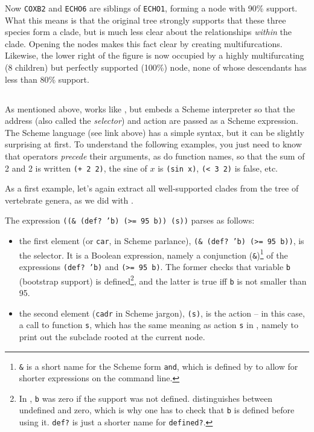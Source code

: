 \noindent{}Now \texttt{COXB2} and \texttt{ECHO6} are siblings of
\texttt{ECHO1}, forming a node with 90\% support. What this means is that the
original tree strongly supports that these three species form a clade, but is
much less clear about the relationships \emph{within} the clade. Opening the
nodes makes this fact clear by creating multifurcations. Likewise, the lower
right of the figure is now occupied by a highly multifurcating (8 children) but
perfectly supported (100\%) node, none of whose descendants has less than 80\%
support.

\subsection{\sched}

As mentioned above, \sched{} works like \ed{}, but embeds a Scheme interpreter
so that the address (also called the {\em selector}) and action are passed as a
Scheme expression. The Scheme language (see link above) has a simple syntax,
but it can be slightly surprising at first. To understand the following
examples, you just need to know that operators \emph{precede} their arguments,
as do function names, so that the sum of 2 and 2 is written \texttt{(+ 2 2)},
the sine of $x$ is \texttt{(sin x)}, \texttt{(< 3 2)} is false, etc.

\noindent{}As a first example, let's again extract all
well-supported clades from the tree of vertebrate genera, as we did with \ed.


\begin{samepage}

\end{samepage}

The expression \texttt{((\& (def? 'b) (>= 95 b)) (s))} parses as follows:
\begin{itemize}
	\item the first element (or \texttt{car}, in Scheme parlance),
	\texttt{(\& (def? 'b) (>= 95 b))}, is the selector.  It is a Boolean
	expression, namely a conjunction (\texttt{\&})\footnote{\texttt{\&} is
	a short name for the Scheme form \texttt{and}, which is defined by
	\sched{} to allow for shorter expressions on the command line.} of the
	expressions \texttt{(def? 'b)} and \texttt{(>= 95 b)}.  The former
	checks that variable \texttt{b} (bootstrap support) is
	defined\footnote{In \ed, \texttt{b} was zero if the support was not
	defined. \sched{} distinguishes between undefined and zero, which is
	why one has to check that \texttt{b} is defined before using it.
	\texttt{def?} is just a shorter name for \texttt{defined?}.}, and the
	latter is true iff \texttt{b} is not smaller than 95.
	\item the second element (\texttt{cadr} in Scheme jargon),
	\texttt{(s)}, is the action -- in this case, a call to function
	\texttt{s}, which has the same meaning as action \texttt{s} in \ed,
	namely to print out the subclade rooted at the current node.
\end{itemize}

